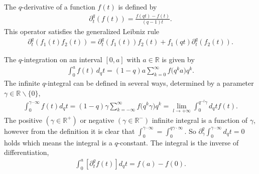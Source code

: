 \documentclass[11pt]{article}
\newcommand{\mR}{\mathbb{R}}
\numberwithin{equation}{section}
\begin{document}
The $q$-derivative of a function $f(t)$ is def\/ined by
\begin{gather}
\label{qder}
\partial^q_t (f(t)) = \frac{f(qt)-f(t)}{(q-1)t}.
\end{gather}
This operator satisf\/ies the generalized Leibniz rule
\begin{gather}
\label{Leibniz}
\partial_t^q(f_1(t)f_2(t)) = \partial_t^q(f_1(t))f_2(t)+f_1(qt)\partial_t^q(f_2(t)).
\end{gather}


The $q$-integration on an interval $[0,a]$ with $a\in \mR$ is given by
\begin{gather*}
\int_{0}^af(t)\,d_qt = (1-q)a\sum_{k=0}^\infty f\big(q^ka\big)q^k.
\end{gather*}
The inf\/inite $q$-integral can be def\/ined in several ways, determined by a parameter $\gamma\in\mR\backslash \{0\}$,
\begin{gather}
\label{gammaint}
\int_0^{\gamma\cdot\infty}f(t)d_qt = (1-q)\gamma\sum_{k=-\infty}^\infty f\big(q^k\gamma\big)q^k=\lim_{l\to+\infty}\int_0^{q^{-l}\gamma}d_qt f(t).
\end{gather}
The positive $(\gamma\in\mR^+)$ or negative $(\gamma\in\mR^-)$ inf\/inite integral is a function of $\gamma$, however from the def\/inition it is clear that $\int_0^{\gamma\cdot\infty}=\int_0^{q\gamma\cdot \infty}$. So $\partial_\gamma^q\int_0^{\gamma\cdot\infty}d_qt=0$ holds which means the integral is a $q$-constant. The integral is the inverse of dif\/ferentiation,
\begin{gather}
\label{partint1}
\int_0^{a}\left[\partial_t^qf(t)\right]d_qt = f(a)-f(0).
\end{gather}
\end{document}
